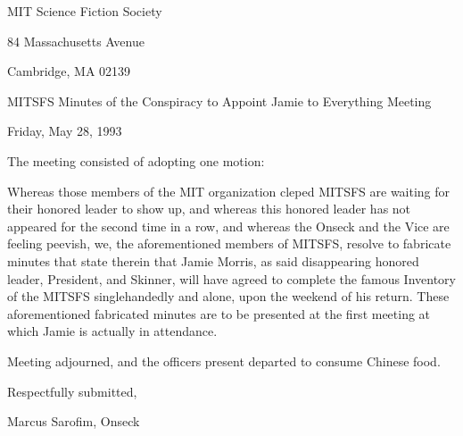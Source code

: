 \documentclass[12pt]{article}
\begin{document}
\begin{center}

MIT Science Fiction Society 

84 Massachusetts Avenue

Cambridge, MA 02139

\vspace{12pt}

MITSFS Minutes of the Conspiracy to Appoint Jamie to Everything Meeting

Friday, May 28, 1993

\end{center}
 
\vspace{18pt}

\setlength{\parskip}{6pt}

The meeting consisted of adopting one motion:

Whereas those members of the MIT organization cleped MITSFS are waiting for their honored leader to show up, and whereas this honored leader has not appeared for the second time in a row, and whereas the Onseck and the Vice are feeling peevish, we, the aforementioned members of MITSFS, resolve to fabricate minutes that state therein that Jamie Morris, as said disappearing honored leader, President, and Skinner, will have agreed to complete the famous Inventory of the MITSFS singlehandedly and alone, upon the weekend of his return. These aforementioned fabricated minutes are to be presented at the first meeting at which Jamie is actually in attendance.

\vspace{12pt}

\noindent
Meeting adjourned, and the officers present departed to consume Chinese food.

\vspace{18pt}

\centerline{Respectfully submitted,}
\centerline{Marcus Sarofim, Onseck}
\end{document}
